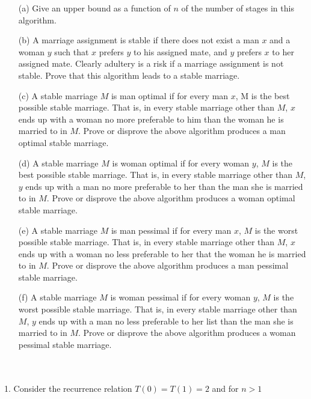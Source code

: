 \documentclass[10pt]{article}
\begin{document}
			\begin{enumerate}
				\item[(a)]  Give an upper bound as a function of $n$ of the number of stages in this algorithm.
				\item[(b)]  A marriage assignment is stable if there does not exist a man $x$ and a woman $y$  such that $x$
										prefers $y$ to his assigned mate, and $y$ prefers $x$ to her assigned mate. Clearly adultery is a risk if
										a marriage assignment is not stable. Prove that this algorithm leads to a stable marriage.
				\item[(c)]  A stable marriage $M$ is man optimal if for every man $x$, M is the best possible stable marriage.
										That is, in every stable marriage other than $M$, $x$ ends up with a woman no more preferable to
										him than the woman he is married to in $M$.  Prove or disprove the above algorithm produces a
										man optimal stable marriage.
				\item[(d)]  A stable marriage $M$  is woman optimal if for every woman $y$,  $M$  is the best  possible stable
										marriage.   That is,  in every  stable marriage other  than $M$,  $y$  ends  up with a  man no  more
										preferable to her than the man she is married to in $M$.  Prove or disprove the above algorithm
										produces a woman optimal stable marriage.
				\item[(e)]  A stable marriage $M$ is man pessimal if for every man $x$, $M$ is the worst possible stable marriage.
										That is, in every stable marriage other than $M$, $x$ ends up with a woman no less preferable to her
										that the woman he is married to in $M$.  Prove or disprove the above algorithm produces a man
										pessimal stable marriage.
				\item[(f)]  A stable marriage $M$  is woman pessimal if for every woman $y$, $M$  is the worst possible stable
										marriage. That is, in every stable marriage other than $M$, $y$ ends up with a man no less preferable
										to her list than the man she is married to in $M$. Prove or disprove the above algorithm produces
										a woman pessimal stable marriage.
			\end{enumerate}
	\\
	\\
	1. Consider the recurrence relation $T(0) = T(1) = 2$ and for $n > 1$
	
\end{document}
